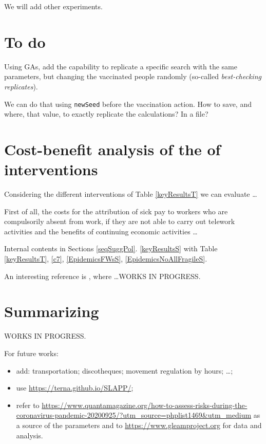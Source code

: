 \documentclass[graybox]{svmult}
\begin{document}
We will add other experiments.


\section{To do}

Using GAs, add the capability to replicate a specific search with the same parameters, but changing the vaccinated people randomly (so-called \emph{best-checking replicates}). 

We can do that using \verb|newSeed| before the vaccination action. How to save, and where, that value, to exactly replicate the calculations? In a file?





\section{Cost-benefit analysis of the of interventions}
\label{CBanalysis}

Considering  the different interventions of Table \ref{keyResultsT} we can evaluate \ldots

First of all, the costs for the attribution of sick pay to workers who are compulsorily absent from work, if they are not able to carry out telework activities and the benefits of continuing economic activities \ldots

Internal contents in Sections \ref{seqSuggPol}. 
\ref{keyResultsS} with Table \ref{keyResultsT}, \ref{c7}, 
\ref{EpidemicsFWsS}, 
\ref{EpidemicsNoAllFragileS}.

An interesting reference is \cite{doi:10.1111/ijcp.13674}, where \ldots WORKS IN PROGRESS.



\section{Summarizing}

WORKS IN PROGRESS.

For future works:
\begin{itemize}

\item add: transportation; discotheques; movement regulation by hours; \ldots;

\item use \url{https://terna.github.io/SLAPP/};

\item refer to \url{https://www.quantamagazine.org/how-to-assess-risks-during-the-coronavirus-pandemic-20200925/?utm_source=phplist1469&utm_medium} as a source of the parameters and to \url{https://www.gleamproject.org} for data and analysis.

\end{itemize}
\end{document}
